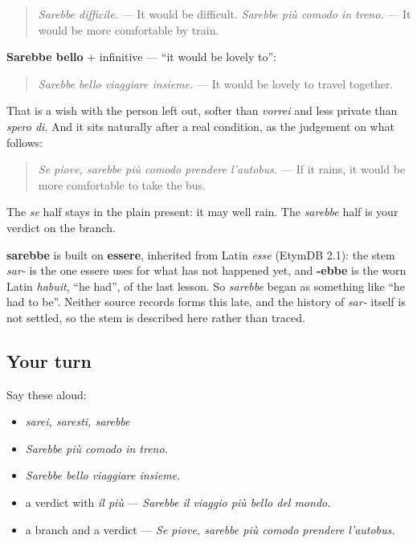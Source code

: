 \begin{quote}
\emph{Sarebbe difficile.} — It would be difficult. \emph{Sarebbe più comodo in treno.} — It would be more comfortable by train.
\end{quote}

\begin{grammarlens}[title={Grammar Lens: sarebbe bello}]
\textbf{Sarebbe bello} + infinitive — \textquotedblleft{}it would be lovely to\textquotedblright{}:

\begin{quote}
\emph{Sarebbe bello viaggiare insieme.} — It would be lovely to travel together.
\end{quote}

That is a wish with the person left out, softer than \emph{vorrei} and less private than \emph{spero di}. And it sits naturally after a real condition, as the judgement on what follows:

\begin{quote}
\emph{Se piove, sarebbe più comodo prendere l'autobus.} — If it rains, it would be more comfortable to take the bus.
\end{quote}

The \emph{se} half stays in the plain present: it may well rain. The \emph{sarebbe} half is your verdict on the branch.
\end{grammarlens}

\begin{cousinweb}
\textbf{sarebbe} is built on \textbf{essere}, inherited from Latin \emph{esse} (EtymDB 2.1): the stem \emph{sar-} is the one essere uses for what has not happened yet, and \textbf{-ebbe} is the worn Latin \emph{habuit}, \textquotedblleft{}he had\textquotedblright{}, of the last lesson. So \emph{sarebbe} began as something like \textquotedblleft{}he had to be\textquotedblright{}. Neither source records forms this late, and the history of \emph{sar-} itself is not settled, so the stem is described here rather than traced.
\end{cousinweb}

\subsection*{Your turn}
Say these aloud:

\begin{itemize}
\raggedright
  \item \emph{sarei, saresti, sarebbe}
  \item \emph{Sarebbe più comodo in treno.}
  \item \emph{Sarebbe bello viaggiare insieme.}
  \item a verdict with \emph{il più} — \emph{Sarebbe il viaggio più bello del mondo.}
  \item a branch and a verdict — \emph{Se piove, sarebbe più comodo prendere l'autobus.}
\end{itemize}

